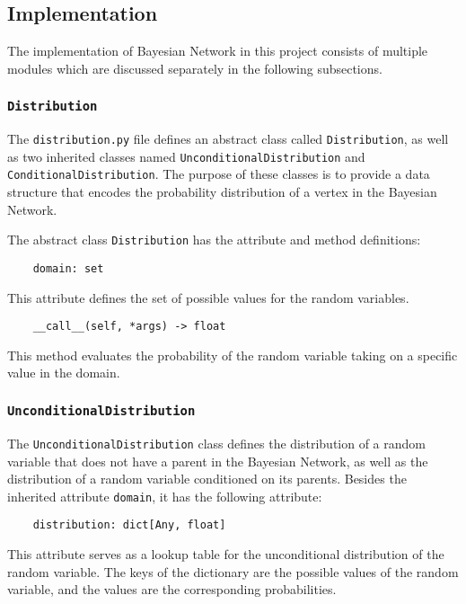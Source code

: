 \documentclass{article}
\theoremstyle{definition}
\begin{document}
\subsection{Implementation}

The implementation of Bayesian Network in this project consists of multiple modules which are discussed separately in the following subsections.

\subsubsection{\texttt{Distribution}}

The \texttt{distribution.py} file defines an abstract class called \texttt{Distribution}, as well as two inherited classes named \texttt{UnconditionalDistribution} and \texttt{ConditionalDistribution}. The purpose of these classes is to provide a data structure that encodes the probability distribution of a vertex in the Bayesian Network.

The abstract class \texttt{Distribution} has the attribute and method definitions:

\begin{verbatim}
    domain: set
\end{verbatim}

This attribute defines the set of possible values for the random variables.

\begin{verbatim}
    __call__(self, *args) -> float
\end{verbatim}

This method evaluates the probability of the random variable taking on a specific value in the domain.

\subsubsection{\texttt{UnconditionalDistribution}}

The \texttt{UnconditionalDistribution} class defines the distribution of a random variable that does not have a parent in the Bayesian Network, as well as the distribution of a random variable conditioned on its parents. Besides the inherited attribute \texttt{domain}, it has the following attribute:

\begin{verbatim}
    distribution: dict[Any, float]
\end{verbatim}

This attribute serves as a lookup table for the unconditional distribution of the random variable. The keys of the dictionary are the possible values of the random variable, and the values are the corresponding probabilities.
\end{document}
